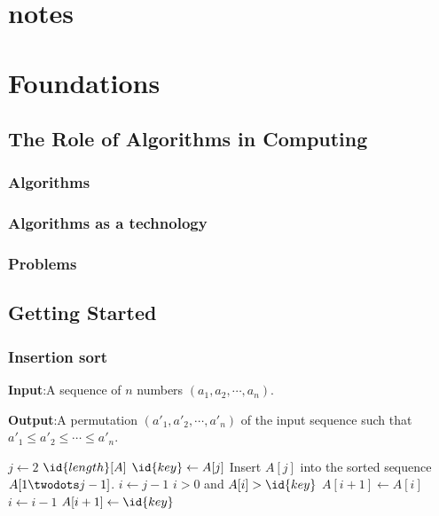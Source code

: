 \documentclass[UTF8,a4paper,12pt]{ctexart}
\begin{document}
    \pagestyle{plain}
    \section*{\huge{notes}}
    \section{Foundations}
        \subsection{The Role of Algorithms in Computing}
            \subsubsection{Algorithms}
            \subsubsection{Algorithms as a technology}
            \subsubsection{Problems}
        \subsection{Getting Started}
            \subsubsection{Insertion sort}
                \textbf{Input}:A sequence of $n$ numbers $(a_1,a_2,\cdots,a_n)$.

                \textbf{Output}:A permutation $(a'_1,a'_2,\cdots,a'_n)$ of the input sequence such that $a'_1 \leq a'_2 \leq \cdots \leq a'_n$.

                \begin{codebox}
                    \li \For $j \gets 2$ \To $\id{length}[A]$    \label{li:for}
                    \li     \Do $\id{key} \gets A[j]$            \label{li:for-begin}
                    \li         \Comment Insert $A[j]$ into the sorted sequence $A[1 \twodots j-1]$.
                    \li         $i \gets j-1$
                    \li         \While $i>0$ and $A[i]>\id{key}$ \label{li:while}
                    \li            \Do $A[i+1] \gets A[i]$       \label{li:while-begin}
                    \li                $i \gets i-1$             \label{li:while-end}
                    \End
                    \li         $A[i+1] \gets \id{key}$          \label{li:for-end}
                    \End
                \end{codebox}
\end{document}
